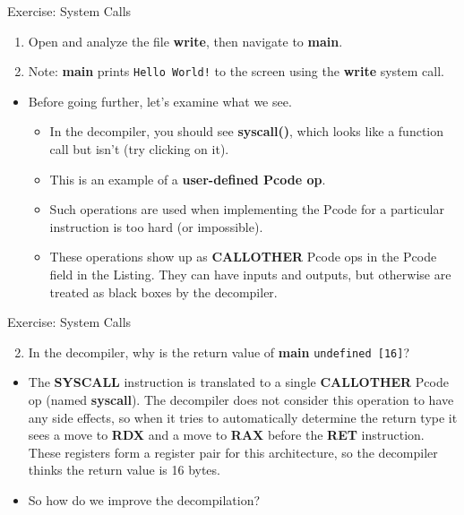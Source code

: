 \documentclass{beamer}
\begin{document}
\begin{frame}
\begin{block}{Exercise: System Calls}
\begin{enumerate}
\item Open and analyze the file \textbf{write}, then navigate to \textbf{main}.
\item[] Note: \textbf{main} prints \texttt{Hello World!} to the screen using the \textbf{write} system call.
\end{enumerate}
\begin{itemize}
\item Before going further, let's examine what we see.
\begin{itemize}
\item In the decompiler, you should see \textbf{syscall()}, which looks like a function call but isn't (try clicking on it). 
\item This is an example of a \textbf{user-defined Pcode op}.
\item Such operations are used when implementing the Pcode for a particular instruction is too hard (or impossible).  
\item These operations show up as \textbf{CALLOTHER} Pcode ops in the Pcode field in the Listing.  They can have inputs and outputs, but otherwise are treated
as black boxes by the decompiler.
\end{itemize}
\end{itemize}
\end{block}
\end{frame}

\begin{frame}
\begin{block}{Exercise: System Calls}
\begin{enumerate}
\setcounter{enumi}{1}
\item In the decompiler, why is the return value of \textbf{main} \texttt{undefined [16]}?
\end{enumerate}
\pause
\begin{itemize}
\item The \textbf{SYSCALL} instruction is translated to a single \textbf{CALLOTHER} Pcode op (named \textbf{syscall}).  The decompiler does not consider this operation to have any 
side effects, so when it tries to automatically determine the return type it sees a move to \textbf{RDX} and a move to \textbf{RAX} before the \textbf{RET} instruction.  
These registers form a register pair for this architecture, so the decompiler thinks the return value is 16 bytes.
\item So how do we improve the decompilation?
\end{itemize}
\end{block}
\end{frame}
\end{document}
